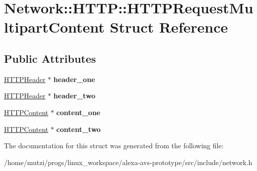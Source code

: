 \hypertarget{structNetwork_1_1HTTP_1_1HTTPRequestMultipartContent}{}\section{Network\+:\+:H\+T\+TP\+:\+:H\+T\+T\+P\+Request\+Multipart\+Content Struct Reference}
\label{structNetwork_1_1HTTP_1_1HTTPRequestMultipartContent}
\subsection*{Public Attributes}
\begin{DoxyCompactItemize}
\item 
\mbox{\label{structNetwork_1_1HTTP_1_1HTTPRequestMultipartContent_adb6fbdfe9453fe958d52cdf2e1f6325c}} 
\hyperlink{classNetwork_1_1HTTP_1_1HTTPHeader}{H\+T\+T\+P\+Header} $\ast$ {\bfseries header\+\_\+one}
\item 
\mbox{\label{structNetwork_1_1HTTP_1_1HTTPRequestMultipartContent_a1e8530fea42585b0eb8eb342ae0a8aa0}} 
\hyperlink{classNetwork_1_1HTTP_1_1HTTPHeader}{H\+T\+T\+P\+Header} $\ast$ {\bfseries header\+\_\+two}
\item 
\mbox{\label{structNetwork_1_1HTTP_1_1HTTPRequestMultipartContent_af72994168bdf38244c1365a8ad6e8e9d}} 
\hyperlink{classNetwork_1_1HTTP_1_1HTTPContent}{H\+T\+T\+P\+Content} $\ast$ {\bfseries content\+\_\+one}
\item 
\mbox{\label{structNetwork_1_1HTTP_1_1HTTPRequestMultipartContent_a99e55c9a4e3f34832119be14674c93eb}} 
\hyperlink{classNetwork_1_1HTTP_1_1HTTPContent}{H\+T\+T\+P\+Content} $\ast$ {\bfseries content\+\_\+two}
\end{DoxyCompactItemize}


The documentation for this struct was generated from the following file\+:\begin{DoxyCompactItemize}
\item 
/home/mutzi/progs/linux\+\_\+workspace/alexa-\/avs-\/prototype/src/include/network.\+h\end{DoxyCompactItemize}
